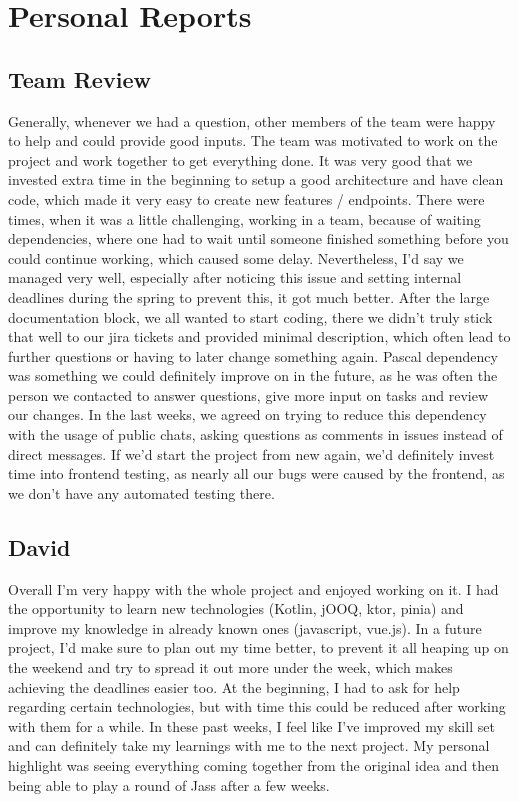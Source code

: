 \chapter{Personal Reports}

\section{Team Review}
Generally, whenever we had a question, other members of the team were happy to help and could provide good inputs.
The team was motivated to work on the project and work together to get everything done.
It was very good that we invested extra time in the beginning to setup a good architecture and have clean code, which made it very easy to create new features / endpoints.
There were times, when it was a little challenging, working in a team, because of waiting dependencies, where one had to wait until someone finished something before you could continue working, which caused some delay.
Nevertheless, I'd say we managed very well, especially after noticing this issue and setting internal deadlines during the spring to prevent this, it got much better.
After the large documentation block, we all wanted to start coding, there we didn't truly stick that well to our jira tickets and provided minimal description, which often lead to further questions or having to later change something again.
Pascal dependency was something we could definitely improve on in the future, as he was often the person we contacted to answer questions, give more input on tasks and review our changes.
In the last weeks, we agreed on trying to reduce this dependency with the usage of public chats, asking questions as comments in issues instead of direct messages.
If we'd start the project from new again, we'd definitely invest time into frontend testing, as nearly all our bugs were caused by the frontend, as we don't have any automated testing there.

\section{David}
Overall I'm very happy with the whole project and enjoyed working on it.
I had the opportunity to learn new technologies (Kotlin, jOOQ, ktor, pinia) and improve my knowledge in already known ones (javascript, vue.js).
In a future project, I'd make sure to plan out my time better, to prevent it all heaping up on the weekend and try to spread it out more under the week, which makes achieving the deadlines easier too.
At the beginning, I had to ask for help regarding certain technologies, but with time this could be reduced after working with them for a while.
In these past weeks, I feel like I've improved my skill set and can definitely take my learnings with me to the next project.
My personal highlight was seeing everything coming together from the original idea and then being able to play a round of Jass after a few weeks.